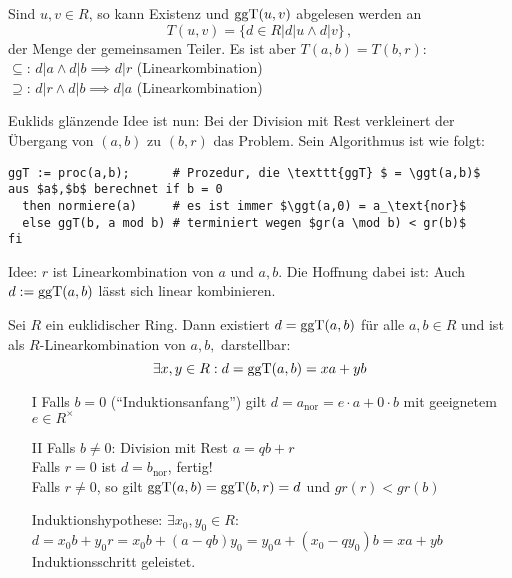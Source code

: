 \documentclass[a4paper,twoside,DIV15,BCOR12mm]{scrbook}
\begin{document}
\begin{beweis}
Sind $u,v \in R$, so kann Existenz und $\mathop{\rm ggT}\nolimits(u,v)$ abgelesen werden
an
\[ T(u,v) = \{d\in R \big| d|u \wedge d|v \}\,,\]
der Menge der gemeinsamen Teiler. Es ist aber $T(a,b) = T(b,r)$:\\
\glqq$\subseteq$\grqq: $d|a \wedge d|b \implies d|r$ (Linearkombination)\\
\glqq$\supseteq$\grqq: $d|r \wedge d|b \implies d|a$
(Linearkombination)
\end{beweis}

Euklids glänzende Idee ist nun: Bei der Division mit Rest
verkleinert der Übergang von $(a,b)$ zu $(b,r)$ das Problem. Sein
Algorithmus ist wie folgt:

\begin{lstlisting}
ggT := proc(a,b);      # Prozedur, die \texttt{ggT} $ = \ggt(a,b)$
aus $a$,$b$ berechnet if b = 0
  then normiere(a)     # es ist immer $\ggt(a,0) = a_\text{nor}$
  else ggT(b, a mod b) # terminiert wegen $gr(a \mod b) < gr(b)$
fi
\end{lstlisting}

Idee: $r$ ist Linearkombination von $a$ und $a,b$. Die Hoffnung
dabei ist: Auch $d:= \mathop{\rm ggT}\nolimits(a,b)$ lässt sich linear kombinieren.

\begin{satz}\label{satz:LinKom}
Sei $R$ ein euklidischer Ring. Dann existiert $d=\mathop{\rm ggT}\nolimits(a,b)$ für alle
$a,b\in R$ und ist als $R$-Linearkombination von $a,b,$ darstellbar:
\[ \exists x,y\in R: d= \mathop{\rm ggT}\nolimits(a,b) = xa + yb \]
\end{satz}

\begin{beweis}
\begin{itemize}
\item[I] Falls $b=0$ ("`Induktionsanfang"') gilt $d= a_\text{nor}= e\cdot a + 0 \cdot b$ mit geeignetem $e\in R^\times$
\item[II] Falls $b\ne 0$: Division mit Rest $a  = qb + r$ \\
Falls $r=0$ ist $d=b_\text{nor}$, fertig!\\
Falls $r\ne0$, so gilt $\mathop{\rm ggT}\nolimits(a,b) = \mathop{\rm ggT}\nolimits(b,r) = d$ und $gr(r)<gr(b)$

Induktionshypothese: $\exists x_0,y_0\in R$: $d=x_0b + y_0 r = x_0 b + (a-qb)y_0  = y_0 a + (x_0-qy_0)b = xa+yb$\\
Induktionsschritt geleistet.
\end{itemize}
\end{beweis}
\end{document}
